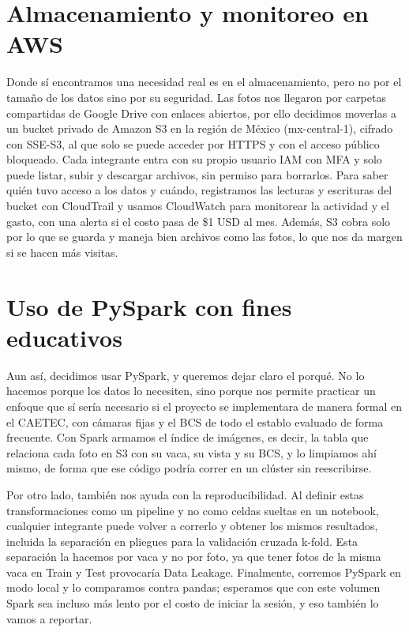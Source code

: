 \documentclass[11pt,letterpaper,DIV=12]{scrartcl}
\begin{document}
\section{Almacenamiento y monitoreo en AWS}

Donde sí encontramos una necesidad real es en el almacenamiento, pero no por el tamaño de los datos sino por su seguridad. Las fotos nos llegaron por carpetas compartidas de Google Drive con enlaces abiertos, por ello decidimos moverlas a un bucket privado de Amazon S3 en la región de México (mx-central-1), cifrado con SSE-S3, al que solo se puede acceder por HTTPS y con el acceso público bloqueado. Cada integrante entra con su propio usuario IAM con MFA y solo puede listar, subir y descargar archivos, sin permiso para borrarlos. Para saber quién tuvo acceso a los datos y cuándo, registramos las lecturas y escrituras del bucket con CloudTrail y usamos CloudWatch para monitorear la actividad y el gasto, con una alerta si el costo pasa de \$1 USD al mes. Además, S3 cobra solo por lo que se guarda y maneja bien archivos como las fotos, lo que nos da margen si se hacen más visitas.

\section{Uso de PySpark con fines educativos}

Aun así, decidimos usar PySpark, y queremos dejar claro el porqué. No lo hacemos porque los datos lo necesiten, sino porque nos permite practicar un enfoque que sí sería necesario si el proyecto se implementara de manera formal en el CAETEC, con cámaras fijas y el BCS de todo el establo evaluado de forma frecuente. Con Spark armamos el índice de imágenes, es decir, la tabla que relaciona cada foto en S3 con su vaca, su vista y su BCS, y lo limpiamos ahí mismo, de forma que ese código podría correr en un clúster sin reescribirse.

Por otro lado, también nos ayuda con la reproducibilidad. Al definir estas transformaciones como un pipeline y no como celdas sueltas en un notebook, cualquier integrante puede volver a correrlo y obtener los mismos resultados, incluida la separación en pliegues para la validación cruzada k-fold. Esta separación la hacemos por vaca y no por foto, ya que tener fotos de la misma vaca en Train y Test provocaría Data Leakage. Finalmente, corremos PySpark en modo local y lo comparamos contra pandas; esperamos que con este volumen Spark sea incluso más lento por el costo de iniciar la sesión, y eso también lo vamos a reportar.
\end{document}
